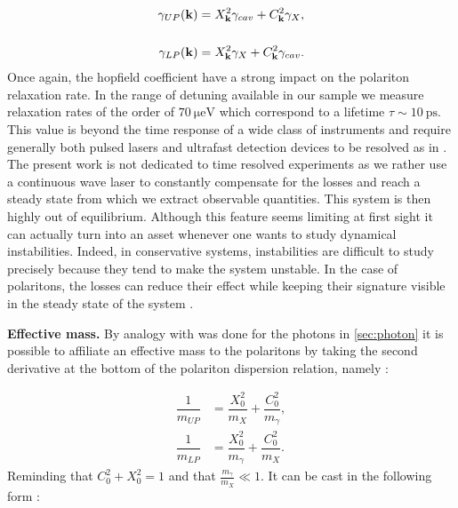 \begin{subequations}
    \begin{align}
    \gamma_{UP}(\mathbf{k})&= X_{\mathbf{k}}^2\gamma_{cav} + C_{\mathbf{k}}^2\gamma_X, \\[5mm]
    \gamma_{LP}(\mathbf{k})&= X_{\mathbf{k}}^2\gamma_X + C_{\mathbf{k}}^2\gamma_{cav}.
    \end{align}
    \label{eq:polariton_relaxation}
\end{subequations}
Once again, the hopfield coefficient have a strong impact on the polariton relaxation rate. In the range of detuning
available in our sample we measure relaxation rates of the order of  $\SI{70}{\micro\electronvolt}$ which correspond to a lifetime  
$\tau \sim \SI{10}{\pico\second}$. This value is beyond the time response of a wide class of instruments and require generally both pulsed lasers and ultrafast
detection devices to be resolved as in \cite{Utsunomiya_fluidlightexp_2008}. The present work is not dedicated to time resolved experiments as we rather use a continuous wave laser to constantly compensate for the losses and reach a steady state from which we extract observable quantities. This system is then highly out of
equilibrium. Although this feature seems limiting at first sight it can actually turn into an asset whenever one wants to study dynamical instabilities. Indeed, in conservative systems, 
instabilities are difficult to study precisely because they tend to make the system unstable. In the case of polaritons, the losses can reduce 
their effect while keeping their signature visible in the steady state of the system \cite{claude_high-resolution_2022}.

\bigskip


\textbf{Effective mass.} By analogy with was done for the photons in \autoref{sec:photon} it is possible to affiliate an effective mass to the polaritons
by taking the second derivative at the bottom of the polariton dispersion relation, namely :

\begin{subequations}
    \begin{align}
    \dfrac{1}{m_{UP}} &= \dfrac{X_0^2}{m_X}+\dfrac{C_0^2}{m_{\gamma}}, \\
    \dfrac{1}{m_{LP}} &= \dfrac{X_0^2}{m_{\gamma}}+\dfrac{C_0^2}{m_X}.
    \end{align}
\end{subequations}
Reminding that $C_0^2 + X_0^2 = 1$ and that $\frac{m_\gamma}{m_X}\ll 1$. It can be cast in the following form :

